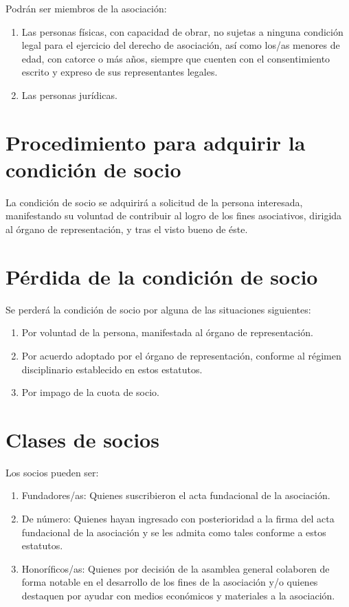 \documentclass[a4paper, 12pt, oneside]{book}
\begin{document}
Podrán ser miembros de la asociación:

\begin{enumerate}
    \item Las personas físicas, con capacidad de obrar, no sujetas a ninguna condición legal para el ejercicio del derecho de asociación, así como los/as menores de edad, con catorce o más años, siempre que cuenten con el consentimiento escrito y expreso de sus representantes legales.
    \item Las personas jurídicas.
\end{enumerate}

\section{Procedimiento para adquirir la condición de socio}

La condición de socio se adquirirá a solicitud de la persona interesada, manifestando su voluntad de contribuir al logro de los fines asociativos, dirigida al órgano de representación, y tras el visto bueno de éste.

\section{Pérdida de la condición de socio}

Se perderá la condición de socio por alguna de las situaciones siguientes:

\begin{enumerate}
    \item Por voluntad de la persona, manifestada al órgano de representación.
    \item Por acuerdo adoptado por el órgano de representación, conforme al régimen disciplinario establecido en estos estatutos.
    \item Por impago de la cuota de socio.
\end{enumerate}

\section{Clases de socios}

Los socios pueden ser:

\begin{enumerate}
    \item Fundadores/as: Quienes suscribieron el acta fundacional de la asociación.
    \item De número: Quienes hayan ingresado con posterioridad a la firma del acta fundacional de la asociación y se les admita como tales conforme a estos estatutos.
    \item Honoríficos/as: Quienes por decisión de la asamblea general colaboren de forma notable en el desarrollo de los fines de la asociación y/o quienes destaquen por ayudar con medios económicos y materiales a la asociación.
\end{enumerate}
\end{document}
